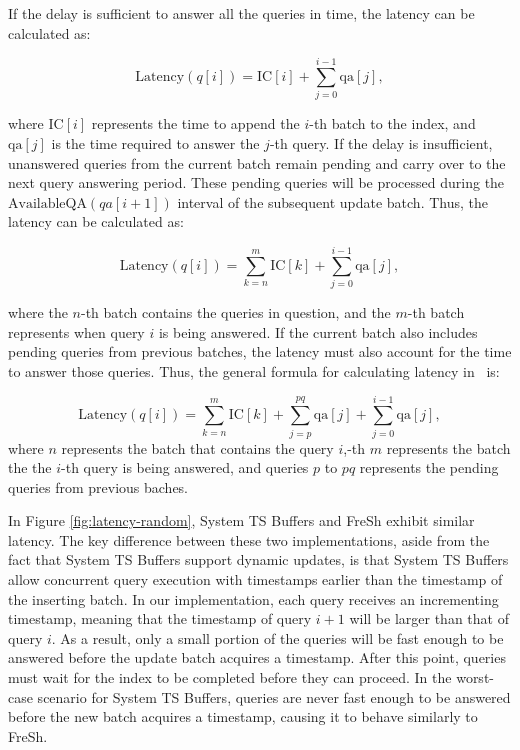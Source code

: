 If the delay is sufficient to answer all the queries in time, the latency can be calculated as:

\[
\text{Latency}(q[i]) = \text{IC}[i] + \sum_{j=0}^{i-1} \text{qa}[j],
\]

where $\text{IC}[i]$ represents the time to append the $i$-th batch to the index, and 
$\text{qa}[j]$ is the time required to answer the $j$-th query. If the delay is insufficient, 
unanswered queries from the current batch remain pending and carry over to the next query 
answering period. These pending queries will be processed during the 
$\text{AvailableQA}(qa[i+1])$ interval of the subsequent update batch. 
Thus, the latency can be calculated as:

\[
\text{Latency}(q[i]) = \sum_{k=n}^{m} \text{IC}[k] + \sum_{j=0}^{i-1} \text{qa}[j],
\]

where the $n$-th batch contains the queries in question, and the $m$-th batch represents 
when query $i$ is being answered. If the current batch also includes pending queries from 
previous batches, the latency must also account for the time to answer those queries. 
Thus, the general formula for calculating latency in \Fresh\ is:

\[
\text{Latency}(q[i]) = \sum_{k=n}^{m} \text{IC}[k] + \sum_{j=p}^{pq} \text{qa}[j] + \sum_{j=0}^{i-1} \text{qa}[j],
\]
where $n$ represents the batch that contains the query $i$,-th 
$m$ represents the batch the the $i$-th query is being answered, 
and queries $p$ to $pq$ represents the pending queries from previous baches.

In Figure \ref{fig:latency-random}, System TS Buffers and FreSh exhibit similar latency. 
The key difference between these two implementations, aside from the fact that System TS Buffers 
support dynamic updates, is that System TS Buffers allow concurrent query execution with timestamps 
earlier than the timestamp of the inserting batch. In our implementation, each query receives 
an incrementing timestamp, meaning that the timestamp of query $i+1$ will be larger than that 
of query $i$. As a result, only a small portion of the queries will be fast enough to be answered
before the update batch acquires a timestamp. After this point, queries must wait for the index to 
be completed before they can proceed. In the worst-case scenario for System TS Buffers, queries 
are never fast enough to be answered before the new batch acquires a timestamp, causing it to 
behave similarly to FreSh.

